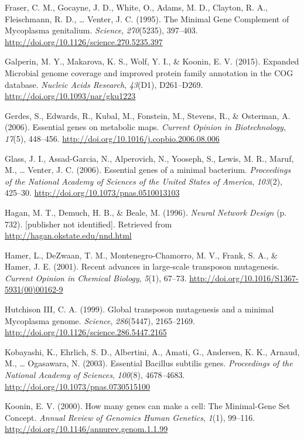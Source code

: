 \documentclass[]{report}
\begin{document}
\hypertarget{ref-Fraser1995}{}
Fraser, C. M., Gocayne, J. D., White, O., Adams, M. D., Clayton, R. A.,
Fleischmann, R. D., \ldots{} Venter, J. C. (1995). The Minimal Gene
Complement of Mycoplasma genitalium. \emph{Science}, \emph{270}(5235),
397--403. \url{http://doi.org/10.1126/science.270.5235.397}

\hypertarget{ref-Galperin2015}{}
Galperin, M. Y., Makarova, K. S., Wolf, Y. I., \& Koonin, E. V. (2015).
Expanded Microbial genome coverage and improved protein family
annotation in the COG database. \emph{Nucleic Acids Research},
\emph{43}(D1), D261--D269. \url{http://doi.org/10.1093/nar/gku1223}

\hypertarget{ref-Gerdes2006}{}
Gerdes, S., Edwards, R., Kubal, M., Fonstein, M., Stevens, R., \&
Osterman, A. (2006). Essential genes on metabolic maps. \emph{Current
Opinion in Biotechnology}, \emph{17}(5), 448--456.
\url{http://doi.org/10.1016/j.copbio.2006.08.006}

\hypertarget{ref-Glass2006}{}
Glass, J. I., Assad-Garcia, N., Alperovich, N., Yooseph, S., Lewis, M.
R., Maruf, M., \ldots{} Venter, J. C. (2006). Essential genes of a
minimal bacterium. \emph{Proceedings of the National Academy of Sciences
of the United States of America}, \emph{103}(2), 425--30.
\url{http://doi.org/10.1073/pnas.0510013103}

\hypertarget{ref-Hagan1996}{}
Hagan, M. T., Demuch, H. B., \& Beale, M. (1996). \emph{Neural Network
Design} (p. 732). {[}publisher not identified{]}. Retrieved from
\url{http://hagan.okstate.edu/nnd.html}

\hypertarget{ref-Hamer2001}{}
Hamer, L., DeZwaan, T. M., Montenegro-Chamorro, M. V., Frank, S. A., \&
Hamer, J. E. (2001). Recent advances in large-scale transposon
mutagenesis. \emph{Current Opinion in Chemical Biology}, \emph{5}(1),
67--73. \url{http://doi.org/10.1016/S1367-5931(00)00162-9}

\hypertarget{ref-HutchisonIII1999}{}
Hutchison III, C. A. (1999). Global transposon mutagenesis and a minimal
Mycoplasma genome. \emph{Science}, \emph{286}(5447), 2165--2169.
\url{http://doi.org/10.1126/science.286.5447.2165}

\hypertarget{ref-Kobayashi2003}{}
Kobayashi, K., Ehrlich, S. D., Albertini, A., Amati, G., Andersen, K.
K., Arnaud, M., \ldots{} Ogasawara, N. (2003). Essential Bacillus
subtilis genes. \emph{Proceedings of the National Academy of Sciences},
\emph{100}(8), 4678--4683. \url{http://doi.org/10.1073/pnas.0730515100}

\hypertarget{ref-Koonin2000}{}
Koonin, E. V. (2000). How many genes can make a cell: The Minimal-Gene
Set Concept. \emph{Annual Review of Genomics Human Genetics},
\emph{1}(1), 99--116. \url{http://doi.org/10.1146/annurev.genom.1.1.99}
\end{document}
